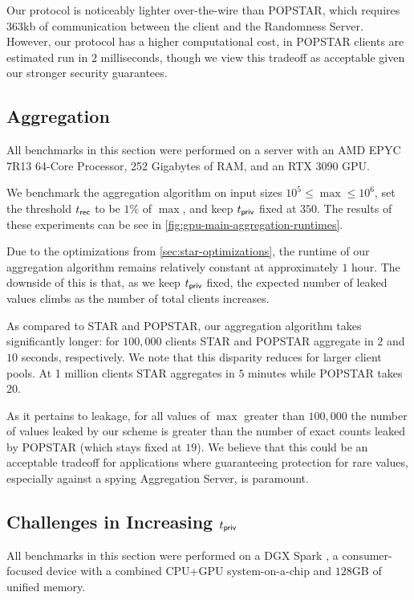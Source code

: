 Our protocol is noticeably lighter over-the-wire than POPSTAR, which requires $363$kb of communication between the client and the Randomness Server.
However, our protocol has a higher computational cost, in POPSTAR clients are estimated run in $2$ milliseconds, though we view this tradeoff as acceptable given our stronger security guarantees.


\subsection{Aggregation}
\label{subsec:agg-experiments}

All benchmarks in this section were performed on a server with an AMD EPYC 7R13 64-Core Processor, 252 Gigabytes of RAM, and an RTX 3090 GPU.

We benchmark the aggregation algorithm on input sizes $10^5 \leq \max \leq 10^6$, set the threshold $t_{\sf rec}$ to be $1\%$ of $\max$, and keep $t_{\sf priv}$ fixed at $350$.
The results of these experiments can be see in \cref{fig:gpu-main-aggregation-runtimes}.



Due to the optimizations from \cref{sec:star-optimizations}, the runtime of our aggregation algorithm remains relatively constant at approximately $1$ hour.
The downside of this is that, as we keep $t_{\sf priv}$ fixed, the expected number of leaked values climbs as the number of total clients increases.

As compared to STAR and POPSTAR, our aggregation algorithm takes significantly longer: for $100{,}000$ clients STAR and POPSTAR aggregate in $2$ and $10$ seconds, respectively.
We note that this disparity reduces for larger client pools.
At 1 million clients STAR aggregates in $5$ minutes while POPSTAR takes $20$.

As it pertains to leakage, for all values of $\max$ greater than $100{,}000$ the number of values leaked by our scheme is greater than the number of exact counts leaked by POPSTAR (which stays fixed at $19$).
We believe that this could be an acceptable tradeoff for applications where guaranteeing protection for rare values, especially against a spying Aggregation Server, is paramount.


\subsection{Challenges in Increasing $t_{\sf priv}$}

All benchmarks in this section were performed on a DGX Spark \cite{nvidia_dgx_spark}, a consumer-focused device with a combined CPU+GPU system-on-a-chip and $128$GB of unified memory.

